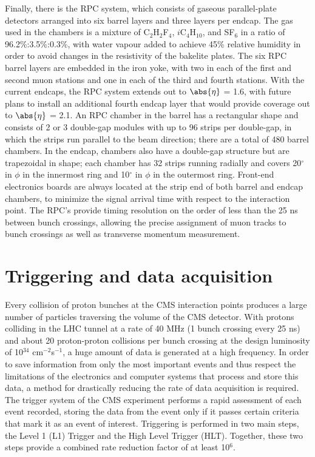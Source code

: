 Finally, there is the RPC system, which consists of gaseous parallel-plate detectors arranged into six barrel layers and three layers per endcap. The gas used in the chambers is a mixture of C$_2$H$_2$F$_4$, $i$C$_4$H$_{10}$, and SF$_6$ in a ratio of 96.2\%:3.5\%:0.3\%, with water vapour added to achieve 45\% relative humidity in order to avoid changes in the resistivity of the bakelite plates. The six RPC barrel layers are embedded in the iron yoke, with two in each of the first and second muon stations and one in each of the third and fourth stations. With the current endcaps, the RPC system extends out to $\abs{\eta}$ = 1.6, with future plans to install an additional fourth endcap layer that would provide coverage out to $\abs{\eta}$ = 2.1. An RPC chamber in the barrel has a rectangular shape and consists of 2 or 3 double-gap modules with up to 96 strips per double-gap, in which the strips run parallel to the beam direction; there are a total of 480 barrel chambers. In the endcap, chambers also have a double-gap structure but are trapezoidal in shape; each chamber has 32 strips running radially and covers 20$^{\circ}$ in $\phi$ in the innermost ring and 10$^{\circ}$ in $\phi$ in the outermost ring. Front-end electronics boards are always located at the strip end of both barrel and endcap chambers, to minimize the signal arrival time with respect to the interaction point. The RPC's provide timing resolution on the order of less than the 25 ns between bunch crossings, allowing the precise assignment of muon tracks to bunch crossings as well as transverse momentum measurement.

\section{Triggering and data acquisition\label{sec:cms-triggerdaq}}
Every collision of proton bunches at the CMS interaction points produces a large number of particles traversing the volume of the CMS detector. With protons colliding in the LHC tunnel at a rate of 40 MHz (1 bunch crossing every 25 ns) and about 20 proton-proton collisions per bunch crossing at the design luminosity of 10$^{34}$ cm$^{-2}$s$^{-1}$, a huge amount of data is generated at a high frequency. In order to save information from only the most important events and thus respect the limitations of the electronics and computer systems that process and store this data, a method for drastically reducing the rate of data acquisition is required. The trigger system of the CMS experiment performs a rapid assessment of each event recorded, storing the data from the event only if it passes certain criteria that mark it as an event of interest. Triggering is performed in two main steps, the Level 1 (L1) Trigger and the High Level Trigger (HLT). Together, these two steps provide a combined rate reduction factor of at least 10$^6$.

